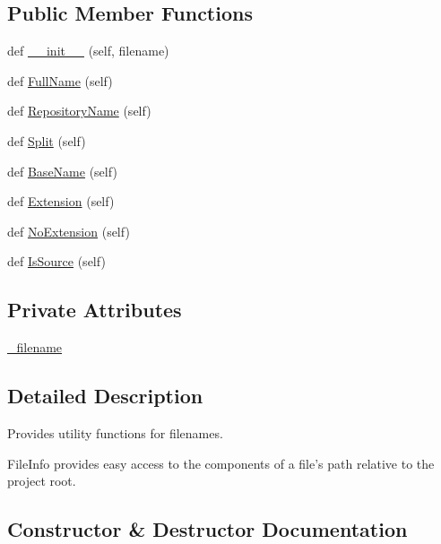 \subsection*{Public Member Functions}
\begin{DoxyCompactItemize}
\item 
def \hyperlink{classcpplint_1_1FileInfo_abd3ff77aab027af2476b3a1d97b1f89c}{\+\_\+\+\_\+init\+\_\+\+\_\+} (self, filename)
\item 
def \hyperlink{classcpplint_1_1FileInfo_aed56577368c45cdf45fc4c9109129145}{Full\+Name} (self)
\item 
def \hyperlink{classcpplint_1_1FileInfo_a2b3b79b7d46221a6b9d0ea0bebac2061}{Repository\+Name} (self)
\item 
def \hyperlink{classcpplint_1_1FileInfo_a43f1c5ff1771da52e29c60c114955e72}{Split} (self)
\item 
def \hyperlink{classcpplint_1_1FileInfo_a1a12ed63ddc2ffd8f6a105e3ab4d6289}{Base\+Name} (self)
\item 
def \hyperlink{classcpplint_1_1FileInfo_a2554b504117839931e901b59a59c67ae}{Extension} (self)
\item 
def \hyperlink{classcpplint_1_1FileInfo_acb46555a72b346966f4bf28c08e3b1fa}{No\+Extension} (self)
\item 
def \hyperlink{classcpplint_1_1FileInfo_a157f8d3266d7291321db88cdad3b2879}{Is\+Source} (self)
\end{DoxyCompactItemize}
\subsection*{Private Attributes}
\begin{DoxyCompactItemize}
\item 
\hyperlink{classcpplint_1_1FileInfo_a6c6c677b6b730b37fc5f198aaa18ab40}{\+\_\+filename}
\end{DoxyCompactItemize}


\subsection{Detailed Description}
\begin{DoxyVerb}Provides utility functions for filenames.

FileInfo provides easy access to the components of a file's path
relative to the project root.
\end{DoxyVerb}
 

\subsection{Constructor \& Destructor Documentation}

